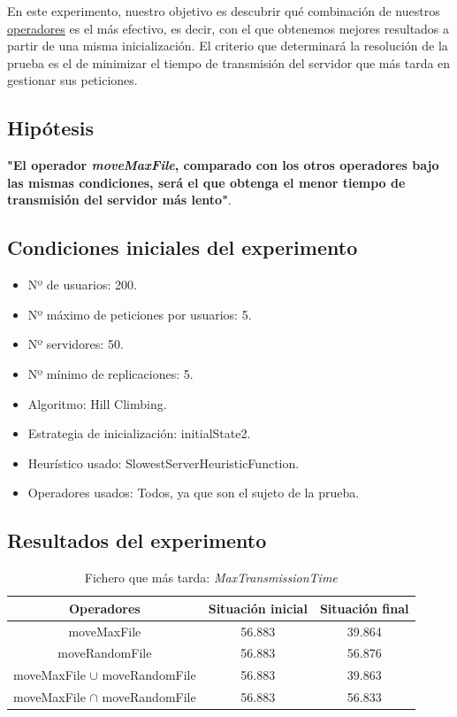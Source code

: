 \documentclass[a4paper,10pt]{report}
\begin{document}
		En este experimento, nuestro objetivo es descubrir qué combinación de nuestros \uline{operadores} es el más efectivo, es decir, con el que obtenemos mejores resultados a partir de una misma inicialización. El criterio que determinará la resolución de la prueba es el de minimizar el tiempo de transmisión del servidor que más tarda en gestionar sus peticiones.
		
		\subsection*{Hipótesis}
		\textbf{"El operador \textit{moveMaxFile}, comparado con los otros operadores bajo las mismas condiciones, será el que obtenga el menor tiempo de transmisión del servidor más lento"}.

		\subsection*{Condiciones iniciales del experimento}
		\begin{itemize}
		    \item Nº de usuarios: 200.
    		\item Nº máximo de peticiones por usuarios: 5.
    		\item Nº servidores: 50.
    		\item Nº mínimo de replicaciones: 5.
    		\item Algoritmo: Hill Climbing.
    		\item Estrategia de inicialización: initialState2.
    		\item Heurístico usado: SlowestServerHeuristicFunction.
    		\item Operadores usados: Todos, ya que son el sujeto de la prueba. 
		\end{itemize}
		
		\subsection*{Resultados del experimento}
		\begin{table}[H]
		\centering
        \begin{tabular}{c|c|c}
            Operadores & Situación inicial & Situación final \\
            \hline
            \hline
            moveMaxFile & 56.883 & 39.864 \\
            \hline
            moveRandomFile & 56.883 & 56.876\\
            \hline
            \makecell{moveMaxFile $\cup$ \\moveRandomFile} & 56.883 & 39.863 \\
            \hline
            \makecell{moveMaxFile $\cap$ \\moveRandomFile} & 56.883 & 56.833 
        \end{tabular}
        \caption*{Fichero que más tarda: \textit{MaxTransmissionTime}}
        \end{table}
        
\end{document}
